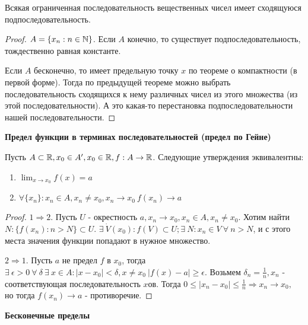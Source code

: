 \documentclass[12pt]{report}
\begin{document}
\begin{thm}
Всякая ограниченная последовательность вещественных чисел имеет  сходящуюся подпоследовательность.
\end{thm}
\begin{proof}
$A = \{x_n: n \in \mathbb{N}\}$. Если $A$ конечно, то существует подпоследовательность, тождественно равная константе.

Если $A$ бесконечно, то имеет предельную точку $x$ по теореме о компактности (в первой форме). Тогда по предыдущей теореме можно выбрать последовательность сходящихся к нему различных чисел из этого множества (из этой последовательности). А это какая-то перестановка подпоследовательности нашей последовательности. 
\end{proof}

\begin{center}
{\bfseries Предел функции в терминах последовательностей (предел по Гейне)}
\end{center}

\begin{thm}\label{conslim}
Пусть $A \subset \mathbb{R}, x_0 \in A', x_0 \in \mathbb{R}, f: A \to \mathbb{R}$. Следующие утверждения эквивалентны:
\begin{enumerate}
\item $\lim_{x \to x_0}{f(x)} = a$
\item $\forall \{x_n\}: x_n \in A, x_n \neq x_0, x_n \to x_0  ~f(x_n) \to a$
\end{enumerate}
\end{thm}
\begin{proof}
$1 \Rightarrow 2$. Пусть $U$ - окрестность $a, x_n \to x_0, x_n \in A, x_n \neq x_0$. Хотим найти $N: \{f(x_n): n > N\} \subset U$. $\exists ~ \dot V(x_0): f(V) \subset U; \exists ~N: x_n \in V ~\forall ~n > N$, и с этого места значения функции попадают в нужное множество.

$2 \Rightarrow 1$. Пусть $a$ не предел $f$ в $x_0$, тогда $\exists ~\epsilon > 0 ~\forall ~\delta ~\exists ~x \in A: |x - x_0| < \delta, x \neq x_0 ~|f(x) - a| \ge \epsilon$. Возьмем $\delta_n = \frac{1}{n}, x_n$ - соответствующая последовательность $x$ов. Тогда $0 \le |x_n - x_0| \le \frac{1}{n} \Rightarrow x_n \to x_0,$ но тогда $f(x_n) \to a$ - противоречие.
\end{proof}

\begin{center}
{\bfseries Бесконечные пределы}
\end{center}
\end{document}
